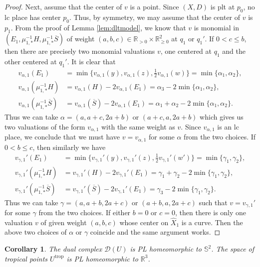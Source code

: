 \documentclass[reqno, 12pt]{amsart}
\newtheorem{cor}[prop]{Corollary}
\theoremstyle{definition}
\newcommand{\bR}{\mathbb{R}}
\newcommand{\bS}{\mathbb{S}}
\newcommand{\cD}{\mathcal{D}}
\newcommand{\hX}{\widehat{X}}
\newcommand{\trop}{\mathrm{trop}}
\newcommand{\oS}{\overline{S}}
\numberwithin{equation}{section}
\begin{document}
\begin{proof}
Next, assume that the center of $v$ is a point.
Since $(X,D)$ is plt at $p_0$, no lc place has center
$p_0$. Thus, by symmetry, we may assume that the center
of $v$ is $p_1$.
From the proof of Lemma \ref{lem:dltmodel}, we know that $v$ is monomial in $(E_1,\mu_{1,*}^{-1} H , \mu_{1,*}^{-1}\oS)$ of weight $(a,b,c)\in \bR_{>0}\times\bR_{\geq 0}^{2}$ at $q_1$ or $q_1'$. If $0<c\leq b$, then there are precisely two monomial valuations $v$, one centered at $q_1$ and the other centered at $q_1'$. It is clear that 
\begin{align*}
v_{\alpha,1}(E_1) &= \min \{v_{\alpha,1}(y), v_{\alpha,1}(z), \tfrac{1}{2}v_{\alpha,1}(w)\} = \min \{\alpha_1, \alpha_2\}, \\
v_{\alpha,1}(\mu_{1,*}^{-1} H )& = v_{\alpha,1}(H)- 2 v_{\alpha,1}(E_1) = \alpha_3 - 2\min \{\alpha_1, \alpha_2\},\\
v_{\alpha,1}(\mu_{1,*}^{-1} \oS ) &= v_{\alpha,1}(\oS)- 2 v_{\alpha,1}(E_1) = \alpha_1 + \alpha_2 - 2\min \{\alpha_1, \alpha_2\}.
\end{align*}
Thus we can take $\alpha = (a, a+c, 2a + b)$ or $(a+c,a, 2a+b)$ which gives us two valuations of the form $v_{\alpha,1}$ with the same weight as $v$. Since $v_{\alpha,1}$ is an lc place, we conclude that we must have $ v=v_{\alpha,1}$ for some $\alpha$ from the two choices. If $0<b\leq c$, then similarly we have 
\begin{align*}
v_{\gamma,1}'(E_1) &= \min \{v_{\gamma,1}'(y), v_{\gamma,1}'(z), \tfrac{1}{2}v_{\gamma,1}'(w')\} = \min \{\gamma_1, \gamma_2\}, \\
v_{\gamma,1}'(\mu_{1,*}^{-1} H )& = v_{\gamma,1}'(H)- 2 v_{\gamma,1}'(E_1) = \gamma_1+\gamma_2 - 2\min \{\gamma_1, \gamma_2\},\\
v_{\gamma,1}'(\mu_{1,*}^{-1} \oS ) &= v_{\gamma,1}'(\oS)- 2 v_{\gamma,1}'(E_1) = \gamma_3 - 2\min \{\gamma_1, \gamma_2\}.
\end{align*}
Thus we can take $\gamma = (a, a+b, 2a + c)$ or $(a+b,a, 2a+c)$ such that $v = v_{\gamma,1}'$ for some $\gamma$ from the two choices. If either $b=0$ or $c=0$, then there is only one valuation $v$ of given weight $(a,b,c)$ whose center on $\hX_1$ is a curve. Then the above two choices of $\alpha$ or $\gamma$ coincide and the same argument works. 
\end{proof}

\begin{cor}
The dual complex $\cD(U)$ is PL homeomorphic to $\bS^2$.  The space of tropical points $U^{\trop}$ is PL homeomorphic to $\bR^3$.
\end{cor}
\end{document}
